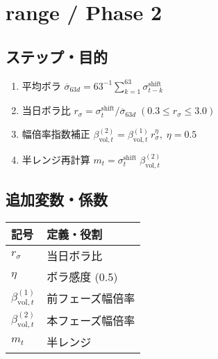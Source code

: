 
\section*{range / Phase 2}\nopagebreak[4]
\subsection*{ステップ・目的}
\begin{flushleft}
\begin{enumerate}
  \item 平均ボラ  
        \(\overline{\sigma}_{63d}=63^{-1}\sum_{k=1}^{63}\sigma_{t-k}^{\text{shift}}\)
  \item 当日ボラ比  
        \(r_\sigma=\sigma_{t}^{\text{shift}}/\overline{\sigma}_{63d}\;(0.3\le r_\sigma\le3.0)\)
  \item 幅倍率指数補正  
        \(\beta_{\text{vol},t}^{(2)}=\beta_{\text{vol},t}^{(1)}\,r_\sigma^{\eta},\;\eta=0.5\)
  \item 半レンジ再計算  
        \(m_t=\sigma_t^{\text{shift}}\;\beta_{\text{vol},t}^{(2)}\)
\end{enumerate}
\end{flushleft}

\subsection*{追加変数・係数}
\begin{flushleft}
\begin{minipage}{0.88\textwidth}
\begin{tabularx}{\textwidth}{@{}lX@{}}
\toprule
記号 & 定義・役割 \\
\midrule
\(r_\sigma\) & 当日ボラ比\\
\(\eta\) & ボラ感度 (0.5)\\
\(\beta_{\text{vol},t}^{(1)}\) & 前フェーズ幅倍率\\
\(\beta_{\text{vol},t}^{(2)}\) & 本フェーズ幅倍率\\
\(m_t\) & 半レンジ\\
\bottomrule
\end{tabularx}
\end{minipage}
\end{flushleft}
